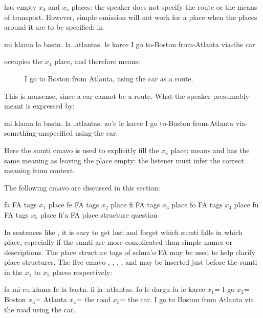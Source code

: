  has empty $x_4$ and $x_5$ places: the
    speaker does not specify the route or the means of transport.
    However, simple omission will not work for a place when the
    places around it are to be specified: in
\begin{example}
mi klama la bastn. la .atlantas. le karce\n
I go to-Boston from-Atlanta via-the car.
\end{example}

 occupies the $x_4$ place, and therefore  means: 
\begin{description}
\item[] I go to Boston from Atlanta, using the car as a route.

\end{description}

This is nonsense, since a car cannot be a route. What the
    speaker presumably meant is expressed by:
\begin{example}
mi klama la bastn. la .atlantas.\n
\T	zo'e le karce\n
I go to-Boston from-Atlanta\n
\T	via-something-unspecified using-the car.
\end{example}

Here the sumti cmavo  is used to explicitly fill the $x_4$
    place;  means  and has the
    same meaning as leaving the place empty: the listener must
    infer the correct meaning from context.



The following cmavo are discussed in this section:

   fa  FA  tags $x_1$ place
    fe  FA  tags $x_2$ place
    fi  FA  tags $x_3$ place
    fo  FA  tags $x_4$ place
    fu  FA  tags $x_5$ place
    fi'a    FA  place structure question

In sentences like , it is easy
    to get lost and forget which sumti falls in which place,
    especially if the sumti are more complicated than simple names
    or descriptions. The place structure tags of selma'o FA may be
    used to help clarify place structures. The five cmavo ,
    , , , and  may be inserted just before
    the sumti in the $x_1$ to $x_5$ places respectively:
\begin{example}
fa mi cu klama fe la bastn.\n
\T	fi la .atlantas. fo le dargu fu le karce\n
$x_1$= I go $x_2$= Boston\n
\T	$x_3$= Atlanta $x_4$= the road $x_5$= the car.\n
I go to Boston from Atlanta via the road using the car.
\end{example}

